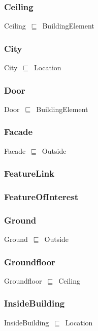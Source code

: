\documentclass{article}
\begin{document}
\subsubsection*{Ceiling}

Ceiling~\ensuremath{\sqsubseteq}~BuildingElement~

\subsubsection*{City}

City~\ensuremath{\sqsubseteq}~Location~

\subsubsection*{Door}

Door~\ensuremath{\sqsubseteq}~BuildingElement~

\subsubsection*{Facade}

Facade~\ensuremath{\sqsubseteq}~Outside~

\subsubsection*{FeatureLink}

\subsubsection*{FeatureOfInterest}

\subsubsection*{Ground}

Ground~\ensuremath{\sqsubseteq}~Outside~

\subsubsection*{Groundfloor}

Groundfloor~\ensuremath{\sqsubseteq}~Ceiling~

\subsubsection*{InsideBuilding}

InsideBuilding~\ensuremath{\sqsubseteq}~Location~
\end{document}
